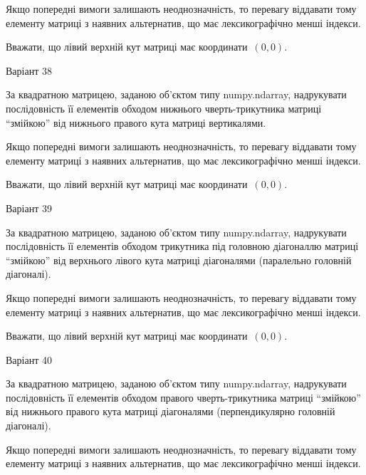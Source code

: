\documentclass[11pt]{article}
\begin{document}
\vspace{2mm}
Якщо попередні вимоги залишають неоднозначність, то перевагу віддавати тому елементу матриці з наявних альтернатив, що має лексикографічно менші індекси.

Вважати, що лівий верхній кут матриці має координати~$(0,0)$.



{\Large \center  Варіант  38\par \bigskip\bigskip}

За квадратною матрицею, заданою об'єктом типу numpy.ndarray, надрукувати послідовність її елементів обходом нижнього чверть-трикутника матриці ``змійкою'' від нижнього правого кута матриці вертикалями.

\vspace{2mm}
Якщо попередні вимоги залишають неоднозначність, то перевагу віддавати тому елементу матриці з наявних альтернатив, що має лексикографічно менші індекси.

Вважати, що лівий верхній кут матриці має координати~$(0,0)$.



{\Large \center  Варіант  39\par \bigskip\bigskip}

За квадратною матрицею, заданою об'єктом типу numpy.ndarray, надрукувати послідовність її елементів обходом трикутника під головною діагоналлю матриці ``змійкою'' від верхнього лівого кута матриці діагоналями (паралельно головній діагоналі).

\vspace{2mm}
Якщо попередні вимоги залишають неоднозначність, то перевагу віддавати тому елементу матриці з наявних альтернатив, що має лексикографічно менші індекси.

Вважати, що лівий верхній кут матриці має координати~$(0,0)$.



{\Large \center  Варіант  40\par \bigskip\bigskip}

За квадратною матрицею, заданою об'єктом типу numpy.ndarray, надрукувати послідовність її елементів обходом правого чверть-трикутника матриці ``змійкою'' від нижнього правого кута матриці діагоналями (перпендикулярно головній діагоналі).

\vspace{2mm}
Якщо попередні вимоги залишають неоднозначність, то перевагу віддавати тому елементу матриці з наявних альтернатив, що має лексикографічно менші індекси.
\end{document}
